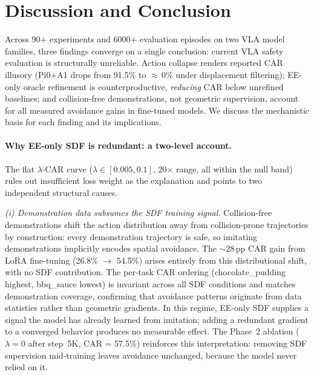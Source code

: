 \section{Discussion and Conclusion}\label{sec:conclusion}

Across 90+ experiments and 6000+ evaluation episodes on two VLA model families, three findings converge on a single conclusion: current VLA safety evaluation is structurally unreliable. Action collapse renders reported CAR illusory (Pi0+A1 drops from 91.5\% to ${\approx}$\,0\% under displacement filtering); EE-only oracle refinement is counterproductive, \emph{reducing} CAR below unrefined baselines; and collision-free demonstrations, not geometric supervision, account for all measured avoidance gains in fine-tuned models. We discuss the mechanistic basis for each finding and its implications.

\paragraph{Why EE-only SDF is redundant: a two-level account.}
The flat $\lambda$-CAR curve ($\lambda \in [0.005, 0.1]$, 20$\times$ range, all within the null band) rules out insufficient loss weight as the explanation and points to two independent structural causes.

\textit{(i) Demonstration data subsumes the SDF training signal.} Collision-free demonstrations shift the action distribution away from collision-prone trajectories by construction: every demonstration trajectory is safe, so imitating demonstrations implicitly encodes spatial avoidance. The ${\sim}$28\,pp CAR gain from LoRA fine-tuning (26.8\% $\to$ 54.5\%) arises entirely from this distributional shift, with no SDF contribution. The per-task CAR ordering (chocolate\_pudding highest, bbq\_sauce lowest) is invariant across all SDF conditions and matches demonstration coverage, confirming that avoidance patterns originate from data statistics rather than geometric gradients. In this regime, EE-only SDF supplies a signal the model has already learned from imitation; adding a redundant gradient to a converged behavior produces no measurable effect. The Phase~2 ablation ($\lambda = 0$ after step~5K, CAR = 57.5\%) reinforces this interpretation: removing SDF supervision mid-training leaves avoidance unchanged, because the model never relied on it.

